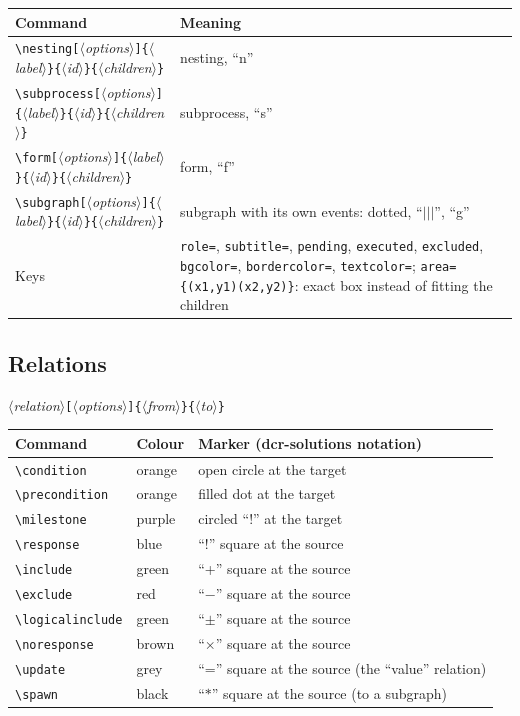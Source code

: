 \documentclass[a4paper,11pt]{article}
\newcommand\cs[1]{\texttt{\textbackslash#1}}
\newcommand\key[1]{\texttt{#1}}
\newcommand\meta[1]{\ensuremath{\langle}\textit{#1}\ensuremath{\rangle}}
\newcommand\marg[1]{\texttt{\{}\meta{#1}\texttt{\}}}
\newcommand\oarg[1]{\texttt{[}\meta{#1}\texttt{]}}
\begin{document}
\medskip
\begin{tabularx}{\linewidth}{@{}lL@{}}
\toprule
Command & Meaning\\
\midrule
\cs{nesting}\oarg{options}\marg{label}\marg{id}\marg{children} & nesting, ``n''\\
\cs{subprocess}\oarg{options}\marg{label}\marg{id}\marg{children} & subprocess, ``s''\\
\cs{form}\oarg{options}\marg{label}\marg{id}\marg{children} & form, ``f''\\
\cs{subgraph}\oarg{options}\marg{label}\marg{id}\marg{children} & subgraph with its
  own events: dotted, ``$|||$'', ``g''\\
\midrule
Keys & \key{role=}, \key{subtitle=}, \key{pending}, \key{executed}, \key{excluded}, \key{bgcolor=},
  \key{bordercolor=}, \key{textcolor=};
  \key{area=\{(x1,y1)(x2,y2)\}}: exact box instead of fitting the children\\
\bottomrule
\end{tabularx}

\subsection{Relations}
\meta{relation}\oarg{options}\marg{from}\marg{to}

\medskip
\begin{tabularx}{\linewidth}{@{}llL@{}}
\toprule
Command & Colour & Marker (dcr-solutions notation)\\
\midrule
\cs{condition} & orange & open circle at the target\\
\cs{precondition} & orange & filled dot at the target\\
\cs{milestone} & purple & circled ``!'' at the target\\
\cs{response} & blue & ``!'' square at the source\\
\cs{include} & green & ``+'' square at the source\\
\cs{exclude} & red & ``$-$'' square at the source\\
\cs{logicalinclude} & green & ``$\pm$'' square at the source\\
\cs{noresponse} & brown & ``$\times$'' square at the source\\
\cs{update} & grey & ``='' square at the source (the ``value'' relation)\\
\cs{spawn} & black & ``$\ast$'' square at the source (to a subgraph)\\
\bottomrule
\end{tabularx}
\end{document}
